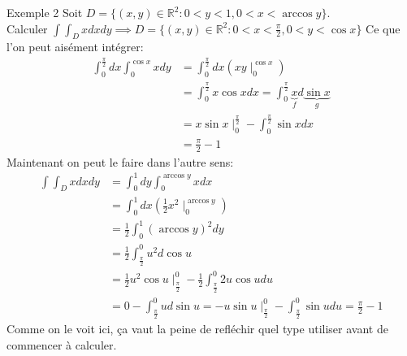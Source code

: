 \begin{parag}{Exemple 2}
	Soit $D = \{ \left(x, y\right) \in \mathbb{R}^{2}: 0 < y < 1, 0 < x < \arccos y\}$.\\
	Calculer $\int\int_D xdxdy \implies D = \{\left(x, y\right) \in\mathbb{R}^{2}:0 < x < \frac{\pi}{2}, 0 < y < \cos x\}$ Ce que l'on peut aisément intégrer:
	\begin{align*} 
		\int_0^{\frac{\pi}{2}}dx \int_0^{\cos x}xdy &= \int_0^{\frac{\pi}{2}}dx (xy\mid_0^{\cos x})\\
							    &= \int_0^{\frac{\pi}{2}}x \cos x dx = \int_0^{\frac{\pi}{2}} \underbrace{x}_{f}d \underbrace{\sin x}_{g}\\
							    &= x\sin x \mid_0^{\frac{\pi}{2}} - \int_0^{\frac{\pi}{2}}\sin x dx\\
							    &= \frac{\pi}{2} - 1
	\end{align*}
	Maintenant on peut le faire dans l'autre sens:
	\begin{align*} 
		\int\int_D x dxdy &= \int_0^1 dy \int_0^{\arccos y}xdx\\
				  &= \int_0^1 dx (\frac{1}{2}x^2 \mid_0^{\arccos y})\\
				  &= \frac{1}{2} \int_0^1 (\arccos y)^2 dy\\
				  &= \frac{1}{2}\int_{\frac{\pi}{2}}^0 u^2 d \cos u\\
				  &= \frac{1}{2} u^2 \cos u \mid_{\frac{\pi}{2}}^0 - \frac{1}{2}\int_{\frac{\pi}{2}}^0 2u \cos u du \\
				  &= 0 - \int_{\frac{\pi}{2}}^0 u d \sin u = -u \sin u\mid_{\frac{\pi}{2}}^0 - \int_{\frac{\pi}{2}}^0\sin u du = \frac{\pi}{2} - 1
	\end{align*}
	Comme on le voit ici, ça vaut la peine de refléchir quel type utiliser avant de commencer à calculer.
\end{parag}



